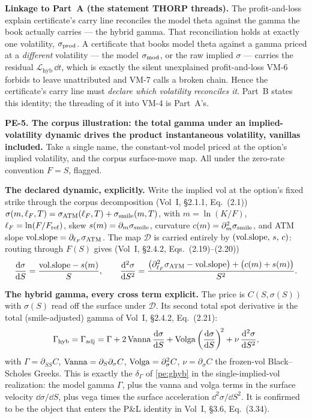 \textbf{Linkage to Part~A (the statement THORP threads).} The
profit-and-loss explain certificate's carry line reconciles the model theta
against the gamma the book actually carries --- the hybrid gamma. That
reconciliation holds at exactly one volatility, $\sigma_{\mathrm{prod}}$. A certificate that
books model theta against a gamma priced at a \emph{different} volatility ---
the model $\sigma_{\mathrm{mod}}$, or the raw implied $\sigma$ --- carries the residual
$\mathcal{L}_{\mathrm{hyb}}\,\dd t$, which is exactly the silent unexplained
profit-and-loss VM-6 forbids to leave unattributed and VM-7 calls a broken
chain. Hence the certificate's carry line must \emph{declare which volatility
reconciles it}. Part~B states this identity; the threading of it into VM-4 is
Part~A's.

\textbf{PE-5. The corpus illustration: the total gamma under an
implied-volatility dynamic drives the product instantaneous volatility,
vanillas included.} Take a single name, the constant-vol model priced at the
option's implied volatility, and the corpus surface-move map. All under the
zero-rate convention $F=S$, flagged.

\textbf{The declared dynamic, explicitly.} Write the implied vol at the option's
fixed strike through the corpus decomposition (Vol~I, \S2.1.1, Eq.~(2.1))
$\sigma(m,\ell_F,T) = \sigma_{\mathrm{ATM}}(\ell_F,T) + \sigma_{\mathrm{smile}}(m,T)$, with $m=\ln(K/F)$,
$\ell_F=\ln(F/F_{\mathrm{ref}})$, skew $s(m)=\partial_m\sigma_{\mathrm{smile}}$, curvature
$c(m)=\partial_m^2\sigma_{\mathrm{smile}}$, and ATM slope $\mathrm{vol.slope}=\partial_{\ell_F}\sigma_{\mathrm{ATM}}$. The map
$\mathcal{D}$ is carried entirely by $(\mathrm{vol.slope},\,s,\,c)$: routing through
$F(S)$ gives (Vol~I, \S2.4.2, Eqs.~(2.19)--(2.20))
\begin{equation}\label{pe:dsig}
  \frac{\mathrm{d}\sigma}{\mathrm{d} S} = \frac{\mathrm{vol.slope} - s(m)}{S},
  \qquad
  \frac{\mathrm{d}^2\sigma}{\mathrm{d} S^2}
  = \frac{\bigl(\partial_{\ell_F}^2\sigma_{\mathrm{ATM}} - \mathrm{vol.slope}\bigr) + \bigl(c(m)+s(m)\bigr)}{S^2}.
\end{equation}

\textbf{The hybrid gamma, every cross term explicit.} The price is
$C(S,\sigma(S))$ with $\sigma(S)$ read off the surface under $\mathcal{D}$. Its
second total spot derivative is the total (smile-adjusted) gamma of Vol~I, \S2.4.2,
Eq.~(2.21):
\begin{equation}\label{pe:gadj}
  \Gamma_{\mathrm{hyb}} = \Gamma_{\mathrm{adj}}
  = \Gamma + 2\,\mathrm{Vanna}\,\frac{\mathrm{d}\sigma}{\mathrm{d} S}
    + \mathrm{Volga}\left(\frac{\mathrm{d}\sigma}{\mathrm{d} S}\right)^{\!2}
    + \nu\,\frac{\mathrm{d}^2\sigma}{\mathrm{d} S^2},
\end{equation}
with $\Gamma=\partial_{SS}C$, $\mathrm{Vanna}=\partial_S\partial_\sigma C$,
$\mathrm{Volga}=\partial_\sigma^2 C$, $\nu=\partial_\sigma C$ the frozen-vol
Black--Scholes Greeks. This is exactly the $\delta_\Gamma$ of
\eqref{pe:ghyb} in the single-implied-vol realization: the model gamma
$\Gamma$, plus the vanna and volga terms in the surface velocity
$\dd\sigma/\dd S$, plus vega times the surface acceleration $\dd^2\sigma/\dd
S^2$. It is confirmed to be the object that enters the P\&L identity in
Vol~I, \S3.6, Eq.~(3.34).

